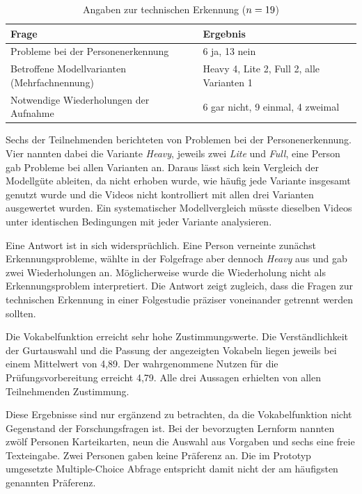\documentclass[intern]{cgMA}
\begin{document}
\begin{table}[htbp]
\centering
\small
\begin{tabular}{p{} p{}}
\hline
\textbf{Frage} & \textbf{Ergebnis} \\ \hline
Probleme bei der Personenerkennung & 6 ja, 13 nein \\
Betroffene Modellvarianten (Mehrfachnennung) & Heavy 4, Lite 2, Full 2, alle Varianten 1 \\
Notwendige Wiederholungen der Aufnahme & 6 gar nicht, 9 einmal, 4 zweimal \\ \hline
\end{tabular}
\caption{Angaben zur technischen Erkennung ($n=19$)}
\label{tab:eval_erkennung}
\end{table}

Sechs der \Nteiln{} Teilnehmenden berichteten von Problemen bei der Personenerkennung. Vier nannten dabei die Variante \textit{Heavy}, jeweils zwei \textit{Lite} und \textit{Full}, eine Person gab Probleme bei allen Varianten an. Daraus lässt sich kein Vergleich der Modellgüte ableiten, da nicht erhoben wurde, wie häufig jede Variante insgesamt genutzt wurde und die Videos nicht kontrolliert mit allen drei Varianten ausgewertet wurden. Ein systematischer Modellvergleich müsste dieselben Videos unter identischen Bedingungen mit jeder Variante analysieren.

Eine Antwort ist in sich widersprüchlich. Eine Person verneinte zunächst Erkennungsprobleme, wählte in der Folgefrage aber dennoch \textit{Heavy} aus und gab zwei Wiederholungen an. Möglicherweise wurde die Wiederholung nicht als Erkennungsproblem interpretiert. Die Antwort zeigt zugleich, dass die Fragen zur technischen Erkennung in einer Folgestudie präziser voneinander getrennt werden sollten.

Die Vokabelfunktion erreicht sehr hohe Zustimmungswerte. Die Verständlichkeit der Gurtauswahl und die Passung der angezeigten Vokabeln liegen jeweils bei einem Mittelwert von 4,89. Der wahrgenommene Nutzen für die Prüfungsvorbereitung erreicht 4,79. Alle drei Aussagen erhielten von allen Teilnehmenden Zustimmung.

Diese Ergebnisse sind nur ergänzend zu betrachten, da die Vokabelfunktion nicht Gegenstand der Forschungsfragen ist. Bei der bevorzugten Lernform nannten zwölf Personen Karteikarten, neun die Auswahl aus Vorgaben und sechs eine freie Texteingabe. Zwei Personen gaben keine Präferenz an. Die im Prototyp umgesetzte Multiple-Choice Abfrage entspricht damit nicht der am häufigsten genannten Präferenz.
\end{document}
